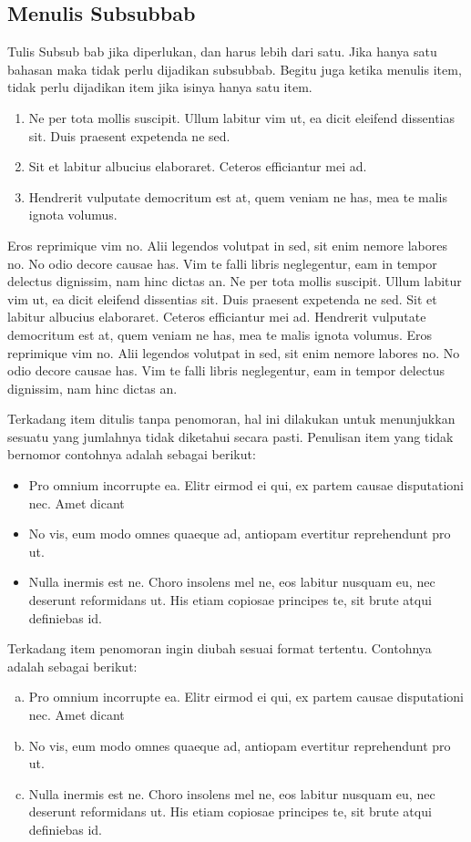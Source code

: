 \subsection{Menulis Subsubbab}
Tulis Subsub bab jika diperlukan, dan harus lebih dari satu. Jika hanya satu bahasan maka tidak perlu dijadikan subsubbab. Begitu juga ketika menulis item, tidak perlu dijadikan item jika isinya hanya satu item.
\begin{enumerate}
    \item Ne per tota mollis suscipit. Ullum labitur vim ut, ea dicit eleifend dissentias sit. Duis praesent expetenda ne sed.
    \item Sit et labitur albucius elaboraret. Ceteros efficiantur mei ad.
    \item Hendrerit vulputate democritum est at, quem veniam ne has, mea te malis ignota volumus.
\end{enumerate}

Eros reprimique vim no. Alii legendos volutpat in sed, sit enim nemore labores no. No odio decore causae has. Vim te falli libris neglegentur, eam in tempor delectus dignissim, nam hinc dictas an. Ne per tota mollis suscipit. Ullum labitur vim ut, ea dicit eleifend dissentias sit. Duis praesent expetenda ne sed. Sit et labitur albucius elaboraret. Ceteros efficiantur mei ad. Hendrerit vulputate democritum est at, quem veniam ne has, mea te malis ignota volumus. Eros reprimique vim no. Alii legendos volutpat in sed, sit enim nemore labores no. No odio decore causae has. Vim te falli libris neglegentur, eam in tempor delectus dignissim, nam hinc dictas an.

Terkadang item ditulis tanpa penomoran, hal ini dilakukan untuk menunjukkan sesuatu yang jumlahnya tidak diketahui secara pasti. Penulisan item yang tidak bernomor contohnya adalah sebagai berikut:
\begin{itemize}
    \item Pro omnium incorrupte ea. Elitr eirmod ei qui, ex partem causae disputationi nec. Amet dicant
    \item No vis, eum modo omnes quaeque ad, antiopam evertitur reprehendunt pro ut.
    \item Nulla inermis est ne. Choro insolens mel ne, eos labitur nusquam eu, nec deserunt reformidans ut. His etiam copiosae principes te, sit brute atqui definiebas id.
\end{itemize}

Terkadang item penomoran ingin diubah sesuai format tertentu. Contohnya adalah sebagai berikut:
\begin{enumerate}[a).]
    \item Pro omnium incorrupte ea. Elitr eirmod ei qui, ex partem causae disputationi nec. Amet dicant
    \item No vis, eum modo omnes quaeque ad, antiopam evertitur reprehendunt pro ut.
    \item Nulla inermis est ne. Choro insolens mel ne, eos labitur nusquam eu, nec deserunt reformidans ut. His etiam copiosae principes te, sit brute atqui definiebas id.
\end{enumerate}

